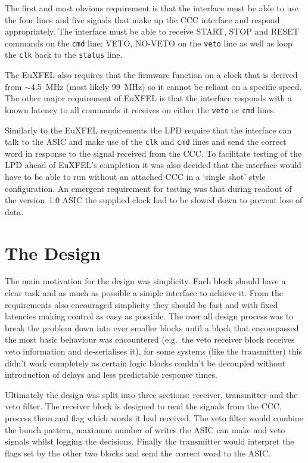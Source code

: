 The first and most obvious requirement is that the interface must be able to use the four lines and five signals that make up the CCC interface and respond appropriately. The interface must be able to receive START, STOP and RESET commands on the \texttt{cmd} line; VETO, NO-VETO on the \texttt{veto} line as well as loop the \texttt{clk} back to the \texttt{status} line. 

The EuXFEL also requires that the firmware function on a clock that is derived from \(\sim\)4.5~MHz (most likely 99~MHz) so it cannot be reliant on a specific speed. The other major requirement of EuXFEL is that the interface responds with a known latency to all commands it receives on either the \texttt{veto} or \texttt{cmd} lines.

Similarly to the EuXFEL requirements the LPD require that the interface can talk to the ASIC and make use of the \texttt{clk} and \texttt{cmd} lines and send the correct word in response to the signal received from the CCC. To facilitate testing of the LPD ahead of EuXFEL's completion it was also decided that the interface would have to be able to run without an attached CCC in a `single shot' style configuration. An emergent requirement for testing was that during readout of the version~1.0 ASIC the supplied clock had to be slowed down to prevent loss of data. 
\section{The Design} %
\label{sec:the_design}
The main motivation for the design was simplicity. Each block should have a clear task and as much as possible a simple interface to achieve it. From the requirements also encouraged simplicity they should be fast and with fixed latencies making control as easy as possible. The over all design process was to break the problem down into ever smaller blocks until a block that encompassed the most basic behaviour was encountered (e.g.\ the veto receiver block receives veto information and de-serialises it), for some systems (like the transmitter) this didn't work completely as certain logic blocks couldn't be decoupled without introduction of delays and less predictable response times.

Ultimately the design was split into three sections: receiver, transmitter and the veto filter. The receiver block is designed to read the signals from the CCC, process them and flag which words it had received. The veto filter would combine the bunch pattern, maximum number of writes the ASIC can make and veto signals whilst logging the decisions. Finally the transmitter would interpret the flags set by the other two blocks and send the correct word to the ASIC.

